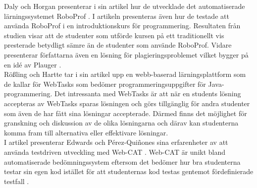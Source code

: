 \documentclass[a4paper,11pt]{article}
\begin{document}
{Daly och Horgan \cite{roboprof_4} presenterar i sin artikel hur de utvecklade det automatiserade lärningssystemet RoboProf \cite{roboprof_4}. I artikeln presenteras även hur de testade att använda RoboProf i en introduktionskurs för programmering. Resultaten från studien visar att de studenter som utförde kursen på ett traditionellt vis presterade betydligt sämre än de studenter som använde RoboProf. Vidare presenterar författarna även en lösning för plagieringsproblemet vilket bygger på en idé av Plauger \cite{plaguer_5}.
\\
Rößling och Hartte \cite{webtasks} tar i sin artikel upp en webb-baserad lärningsplattform som de kallar för WebTasks som bedömer programmeringsuppgifter för Java-programmering. Det intressanta med WebTasks är att när en students lösning accepteras av WebTasks sparas lösningen och görs tillgänglig för andra studenter som även de har fått sina lösningar accepterade. Därmed finns det möjlighet för granskning och diskussion av de olika lösningarna och därav kan studenterna komma fram till alternativa eller effektivare lösningar.
\\
I artikel \cite{edwards_15} presenterar Edwards och Pérez-Quiñones sina erfarenheter av att använda testdriven utveckling med Web-CAT \cite{edwards_15}. Web-CAT är unikt bland automatiserade bedömningssystem eftersom det bedömer hur bra studenterna testar sin egen kod istället för att studenternas kod testas gentemot fördefinierade testfall \cite{edwards_15}.

}
\end{document}
